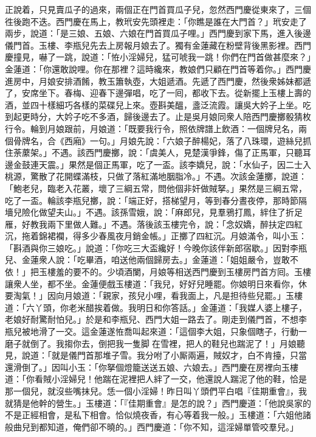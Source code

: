 正說着，只見賣瓜子的過來，{}兩個正在門首買瓜子兒，忽然西門慶從東來了，三個徃後跑不迭。西門慶在馬上，教玳安先頭裡走：「你瞧是誰在大門首？」玳安走了兩步，說道：「是三娘、五娘、六娘在門首買瓜子哩。」西門慶到家下馬，進入後邊儀門首。玉樓、李瓶兒先去上房報月娘去了。獨有金蓮藏在粉壁背後黑影裡。西門慶撞見，嚇了一跳，說道：「恠小淫婦兒，猛可唬我一跳！你們在門首做甚麼來？」金蓮道：「你還敢說哩。你在那裡？這時纔來，教娘們只顧在門首等着你。」西門慶進房中，月娘安排酒餚，教玉簫執壺，大姐遞酒。先遞了西門慶，然後衆姊妹都遞了，安席坐下。春梅、迎春下邊彈唱，吃了一囘，都收下去。從新擺上玉樓上壽的酒，並四十樣細巧各樣的菜碟兒上來。壺斟美醞，盞泛流霞。讓吳大妗子上坐。吃到起更時分，大妗子吃不多酒，歸後邊去了。止是吳月娘同衆人陪西門慶擲骰猜枚行令。輪到月娘跟前，月娘道：「既要我行令，照依牌譜上飲酒：一個牌兒名，兩個骨牌名，合《西廂》一句。」月娘先說：「六娘子醉楊妃，落了八珠環，遊絲兒抓住荼䕷架。」不遇。該西門慶擲，說：「虞美人，見楚漢爭鋒，傷了正馬軍，只聽耳邊金鼓連天震。」果然是個正馬軍，吃了一盃。該李嬌兒，說：「水仙子，因二士入桃源，驚散了花開蝶滿枝，只做了落紅滿地胭脂冷。」不遇。次該金蓮擲，說道：「鮑老兒，臨老入花叢，壞了三綱五常，問他個非奸做賊拏。」{}果然是三綱五常，吃了一盃。輪該李瓶兒擲，說：「端正好，搭梯望月，等到春分晝夜停，那時節隔墻兒險化做望夫山。」不遇。該孫雪娥，說：「麻郎兒，見羣鴉打鳳，絆住了折足雁，好教我兩下里做人難。」不遇。落後該玉樓完令，說：「念奴嬌，醉扶定四紅沉，拖着錦裙襴，得多少春風夜月銷金帳。」正擲了四紅沉。月娘滿令，叫小玉：「斟酒與你三娘吃。」說道：「你吃三大盃纔好！今晚你該伴新郎宿歇。」因對李瓶兒、金蓮衆人說：「吃畢酒，咱送他兩個歸房去。」金蓮道：「姐姐嚴令，豈敢不依！」把玉樓羞的要不的。少頃酒闌，月娘等相送西門慶到玉樓房門首方囘。玉樓讓衆人坐，都不坐。金蓮便戲玉樓道：「我兒，好好兒睡罷。你娘明日來看你，休要淘氣！」因向月娘道：「親家，孩兒小哩，看我面上，凡是担待些兒罷。」玉樓道：「六丫頭，你老米醋挨着做。我明日和你答話。」金蓮道：「我媒人婆上樓子，老娘好耐驚耐怕兒。」於是和李瓶兒、西門大姐一路去了。剛走到儀門首，不想李瓶兒被地滑了一交。這金蓮遂恠喬叫起來道：「這個李大姐，只象個瞎子，行動一磨子就倒了。我搊你去，倒把我一隻脚𨃓在雪裡，把人的鞋兒也踹泥了！」月娘聽見，說道：「就是儀門首那堆子雪。我分咐了小厮兩遍，賊奴才，白不肯擡，只當還滑倒了。」因叫小玉：「你拏個燈籠送送五娘、六娘去。」西門慶在房裡向玉樓道：「你看賊小淫婦兒！他踹在泥裡把人絆了一交，他還說人踹泥了他的鞋，恰是那一個兒，就沒些嘴抹兒。恁一個小淫婦！昨日叫丫頭們平白唱『佳期重會』，我就猜是他幹的營生。」玉樓道：「『佳期重會』是怎的說？」西門慶道：「他說吳家的不是正經相會，是私下相會。恰似燒夜香，有心等着我一般。」{}玉樓道：「六姐他諸般曲兒到都知道，俺們卻不曉的。」西門慶道：「你不知，這淫婦單管咬羣兒。」

